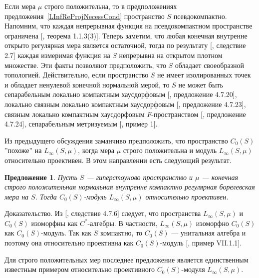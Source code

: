 \documentclass[12pt]{article}
\numberwithin{equation}{subsection}
\theoremstyle{plain}
\newtheorem{proposition}{Предложение}
\newenvironment{proof}{Доказательство.}{}
\begin{document}
\begin{fulltext}
    Если мера $\mu$ строго положительна, то в предположениях
    предложения~\ref{LInfReProjNecessCond} пространство $S$ псевдокомпактно.
    Напомним, что каждая непрерывная функция на псевдокомпактном пространстве
    ограничена [\cite{HrusPseudCompTopSp}, теорема 1.1.3(3)]. Теперь заметим,
    что любая конечная внутренне открыто регулярная мера является остаточной,
    тогда по результату [\cite{ZindResMeasLocCompSp}, следствие 2.7] каждая
    измеримая функция на $S$ непрерывна на открытом плотном множестве. Эти факты
    позволяют предположить, что $S$ обладает своеобразной топологией.
    Действительно, если пространство $S$ не имеет изолированных точек и обладает
    ненулевой конечной нормальной мерой, то $S$ не может быть сепарабельным
    локально компактным хаусдорфовым [\cite{DalesBanSpContFunDualSp},
    предложение 4.7.20], локально связным локально компактным хаусдорфовым
    [\cite{DalesBanSpContFunDualSp}, предложение 4.7.23], связным локально
    компактным хаусдорфовым $F$-пространством [\cite{DalesBanSpContFunDualSp},
    предложение 4.7.24], сепарабельным метризуемым [\cite{FlachNormMeasTopSp},
    пример 1].


    Из предыдущего обсуждения заманчиво предположить, что пространство $C_0(S)$
    ''похоже'' на  $L_\infty(S,\mu)$, когда мера $\mu$ строго положительна и
    модуль $L_\infty(S,\mu)$ относительно проективен. В этом направлении есть
    следующий результат.

    \begin{proposition}\label{LInfReProjSuffCond} Пусть $S$ --- гиперстоуново
        пространство и $\mu$ --- конечная строго положительная нормальная
        внутренне компактно регулярная борелевская мера на $S$. Тогда
        $C_0(S)$-модуль $L_\infty(S,\mu)$ относительно проективен.
    \end{proposition}
    \begin{proof} Из [\cite{DalesBanSpContFunDualSp}, следствие 4.7.6] следует,
        что пространства $L_\infty(S,\mu)$ и $C_0(S)$ изоморфны как
        $C^*$-алгебры. В частности, $L_\infty(S,\mu)$ изоморфно $C_0(S)$ как
        $C_0(S)$-модуль. Так как $S$ компактно, то $C_0(S)$ --- унитальная
        алгебра и поэтому она относительно проективна как $C_0(S)$-модуль
        [\cite{HelBanLocConvAlg}, пример VII.1.1].
    \end{proof}

    Для строго положительных мер последнее предложение является единственным
    известным примером относительно проективного $C_0(S)$-модуля
    $L_\infty(S,\mu)$.

\end{fulltext}
\end{document}

